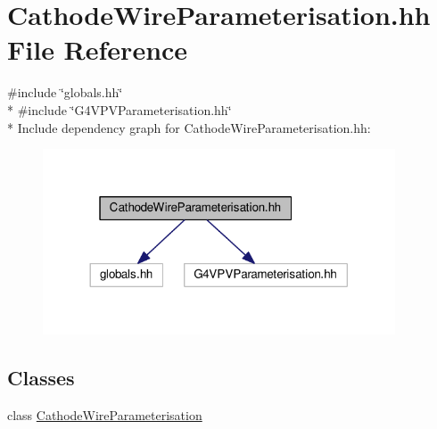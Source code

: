 \hypertarget{CathodeWireParameterisation_8hh}{}\section{Cathode\+Wire\+Parameterisation.\+hh File Reference}
\label{CathodeWireParameterisation_8hh}
{\ttfamily \#include \char`\"{}globals.\+hh\char`\"{}}\\*
{\ttfamily \#include \char`\"{}G4\+V\+P\+V\+Parameterisation.\+hh\char`\"{}}\\*
Include dependency graph for Cathode\+Wire\+Parameterisation.\+hh\+:
\nopagebreak
\begin{figure}[H]
\begin{center}
\leavevmode
\includegraphics[width=296pt]{CathodeWireParameterisation_8hh__incl}
\end{center}
\end{figure}
\subsection*{Classes}
\begin{DoxyCompactItemize}
\item 
class \hyperlink{classCathodeWireParameterisation}{Cathode\+Wire\+Parameterisation}
\end{DoxyCompactItemize}
